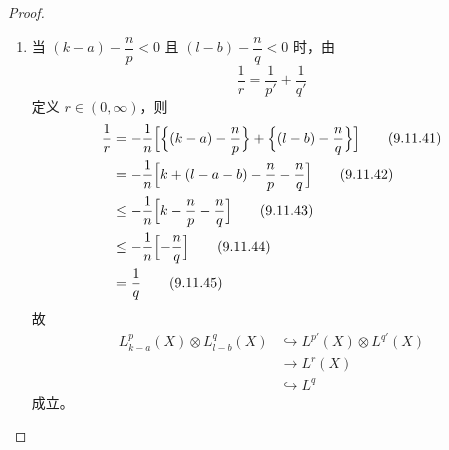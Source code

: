 \begin{proof}
\begin{enumerate}[label=\arabic*., leftmargin=2.2em]
\begin{enumerate}[label=(\roman*), leftmargin=2.4em]
由假设 $k-\dfrac np>0$，故 $l-\dfrac nq>0$。于是 $L^q_l(X)\subset C^0(X)$，且
\begin{align}
  L^p_{k-a}(X)\otimes L^q_{l-b}(X)
  &\hookrightarrow L^q(X)\otimes C^0(C)
  \tag{9.11.33}\\
  &\to L^q(X)
  \tag{9.11.34}
\end{align}
成立。

  \item 当 (9.11.31) 中不取等号时，对充分小的正数 $\epsilon$ 有
\begin{equation}
  L^p_{k-a}\hookrightarrow L^{q+\epsilon}
  \tag{9.11.35}
\end{equation}
其中由
\begin{equation}
  \frac1{q+\epsilon} + \frac1r = \frac1q
  \tag{9.11.36}
\end{equation}
定义 $r\in(1,\infty)$，则
\begin{align}
  L^p_{k-a}(X)\otimes L^q_{l-b}(X)
  &\hookrightarrow L^{q+\epsilon}(X)\otimes L^\infty(X)
  \tag{9.11.37}\\
  &\hookrightarrow L^{q+\epsilon}(X)\otimes L^r(X)
  \tag{9.11.38}\\
  &\to L^q
  \tag{9.11.39}
\end{align}
成立。
  \end{enumerate}
\item 当 $(k-a)-\dfrac np<0$ 且 $(l-b)-\dfrac nq<0$ 时，由
\begin{equation}
  \frac1r = \frac1{p'} + \frac1{q'}
  \tag{9.11.40}
\end{equation}
定义 $r\in(0,\infty)$，则
\begin{align}
  \frac1r &= -\frac1n\Bigl[\Bigl\{(k-a)-\frac np\Bigr\}
    + \Bigl\{(l-b)-\frac nq\Bigr\}\Bigr]
  \tag{9.11.41}\\
  &= -\frac1n\Bigl[k+(l-a-b)-\frac np-\frac nq\Bigr]
  \tag{9.11.42}\\
  &\le -\frac1n\Bigl[k-\frac np-\frac nq\Bigr]
  \tag{9.11.43}\\
  &\le -\frac1n\Bigl[-\frac nq\Bigr]
  \tag{9.11.44}\\
  &= \frac1q
  \tag{9.11.45}
\end{align}
故
\begin{align}
  L^p_{k-a}(X)\otimes L^q_{l-b}(X)
  &\hookrightarrow L^{p'}(X)\otimes L^{q'}(X)
  \tag{9.11.46}\\
  &\to L^r(X)
  \tag{9.11.47}\\
  &\hookrightarrow L^q
  \tag{9.11.48}
\end{align}
成立。
\end{enumerate}
\end{proof}


